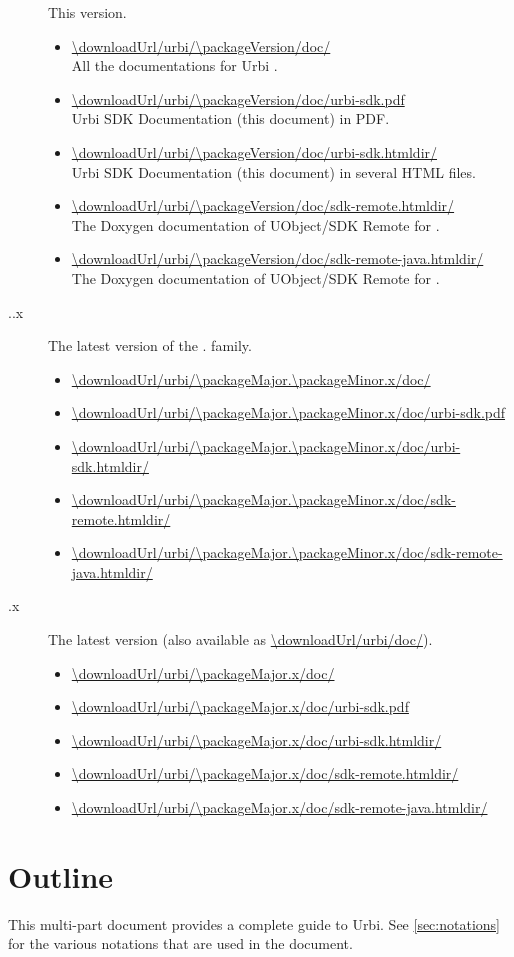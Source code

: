 \newcommand{\docItem}[2]{\item \url{#1} \\ #2.}
\newcommand{\versionItem}[2]
{
\item[\packageName{} #1] #2.

  \begin{itemize}
    \docItem{\downloadUrl/urbi/#1/doc/}
    {All the documentations for Urbi #1}
    \docItem{\downloadUrl/urbi/#1/doc/urbi-sdk.pdf}
    {Urbi SDK Documentation (this document) in PDF}
    \docItem{\downloadUrl/urbi/#1/doc/urbi-sdk.htmldir/}
    {Urbi SDK Documentation (this document) in several HTML files}
    \docItem{\downloadUrl/urbi/#1/doc/sdk-remote.htmldir/}
    {The Doxygen documentation of UObject/SDK Remote for \Cxx}
    \docItem{\downloadUrl/urbi/#1/doc/sdk-remote-java.htmldir/}%
    {The Doxygen documentation of UObject/SDK Remote for \Java}
  \end{itemize}
}

\begin{description}
  \versionItem{\packageVersion}{This version}
  \renewcommand{\docItem}[2]{\item \url{#1}}
  \versionItem{\packageMajor.\packageMinor.x}{The latest version of the
    \packageMajor.\packageMinor{} family}
  \versionItem{\packageMajor.x}{The latest version (also available as
    \url{\downloadUrl/urbi/doc/})}
\end{description}

\section{Outline}

This multi-part document provides a complete guide to Urbi.  See
\autoref{sec:notations} for the various notations that are used in the
document.

\newenvironment{partDescription}[2]
{%
  \item[\autoref{#1} --- \nameref{#1}]~\\%
  #2
  \begin{description}%
    \let\itemOrig\item%
    \renewcommand{\item}[1][]{\itemOrig[~~\autoref{##1} --- \nameref{##1}]~\\}%
  }{%
  \end{description}%
}

\begin{description}




{
  
}

\end{description}

